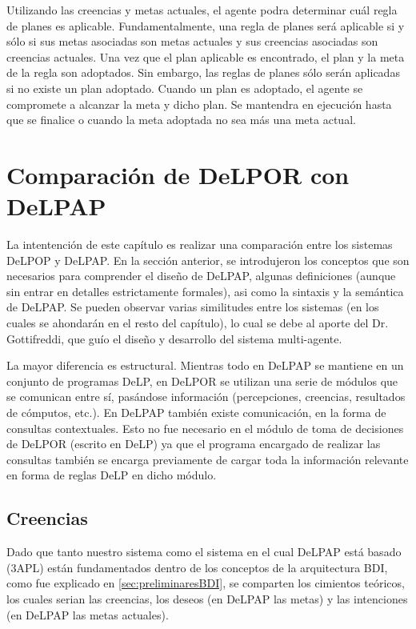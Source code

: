 Utilizando las creencias y metas actuales, el agente podra determinar cuál regla de planes es 
aplicable. Fundamentalmente, una regla de planes será aplicable si y sólo si sus metas asociadas son 
metas actuales y sus creencias asociadas son creencias actuales. Una vez que el plan aplicable es 
encontrado, el plan y la meta de la regla son adoptados. Sin embargo, las reglas de planes sólo serán 
aplicadas si no existe un plan adoptado. Cuando un plan es adoptado, el agente se compromete a 
alcanzar la meta y dicho plan. Se mantendra en ejecución hasta que se finalice o cuando la meta 
adoptada no sea más una meta actual.

\section{Comparación de DeLPOR con DeLPAP} %

La intentención de este capítulo es realizar una comparación entre los sistemas DeLPOP y DeLPAP. En la
sección anterior, se introdujeron los conceptos que son necesarios para comprender el diseño de 
DeLPAP, algunas definiciones (aunque sin entrar en detalles estrictamente formales), asi como la 
sintaxis y la semántica de DeLPAP. Se pueden observar varias similitudes entre los sistemas (en los 
cuales se ahondarán en el resto del capítulo), lo cual se debe al aporte del Dr. Gottifreddi, que guío
el diseño y desarrollo del sistema multi-agente.

La mayor diferencia es estructural. Mientras todo en DeLPAP se mantiene en un conjunto de programas 
DeLP, en DeLPOR se utilizan una serie de módulos que se comunican entre sí, pasándose información
(percepciones, creencias, resultados de cómputos, etc.). En DeLPAP también existe comunicación, en la 
forma de consultas contextuales. Esto no fue necesario en el módulo de toma de decisiones de DeLPOR 
(escrito en DeLP) ya que el programa encargado de realizar las consultas también se encarga 
previamente de cargar toda la información relevante en forma de reglas DeLP en dicho módulo.

\subsection{Creencias}

Dado que tanto nuestro sistema como el sistema en el cual DeLPAP está basado (3APL) están 
fundamentados dentro de los conceptos de la arquitectura BDI, como fue explicado en 
\ref{sec:preliminaresBDI}, se comparten los cimientos teóricos, los cuales serian las creencias, los 
deseos (en DeLPAP las metas) y las intenciones (en DeLPAP las metas actuales).

